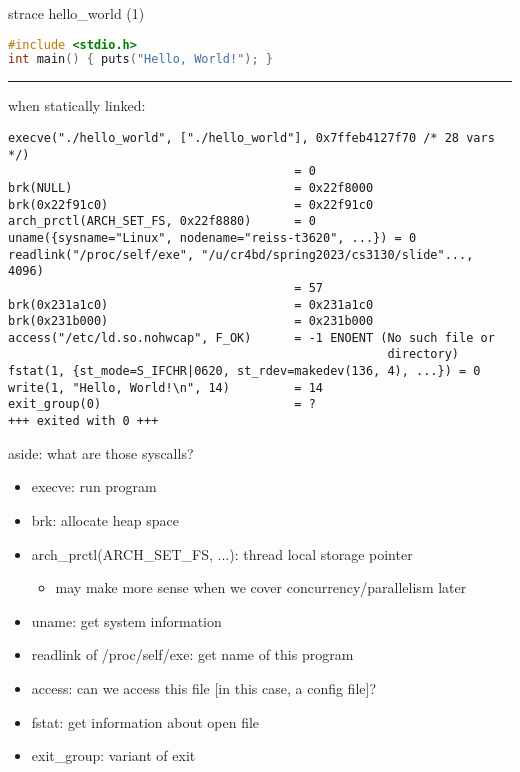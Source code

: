 \begin{frame}[fragile]{strace hello\_world (1)}
\begin{lstlisting}[language=C,style=small]
#include <stdio.h>
int main() { puts("Hello, World!"); }
\end{lstlisting}
\hrule
when statically linked:
\begin{Verbatim}[fontsize=\fontsize{10}{11}\selectfont]
execve("./hello_world", ["./hello_world"], 0x7ffeb4127f70 /* 28 vars */)
                                        = 0
brk(NULL)                               = 0x22f8000
brk(0x22f91c0)                          = 0x22f91c0
arch_prctl(ARCH_SET_FS, 0x22f8880)      = 0
uname({sysname="Linux", nodename="reiss-t3620", ...}) = 0
readlink("/proc/self/exe", "/u/cr4bd/spring2023/cs3130/slide"..., 4096)
                                        = 57
brk(0x231a1c0)                          = 0x231a1c0
brk(0x231b000)                          = 0x231b000
access("/etc/ld.so.nohwcap", F_OK)      = -1 ENOENT (No such file or
                                                     directory)
fstat(1, {st_mode=S_IFCHR|0620, st_rdev=makedev(136, 4), ...}) = 0
write(1, "Hello, World!\n", 14)         = 14
exit_group(0)                           = ?
+++ exited with 0 +++
\end{Verbatim}
\end{frame}

\begin{frame}{aside: what are those syscalls?}
\begin{itemize}
\item execve: run program
\item brk: allocate heap space
\item arch\_prctl(ARCH\_SET\_FS, ...): thread local storage pointer
    \begin{itemize}
    \item may make more sense when we cover concurrency/parallelism later
    \end{itemize}
\item uname: get system information
\item readlink of /proc/self/exe: get name of this program
\item access: can we access this file [in this case, a config file]?
\item fstat: get information about open file
\item exit\_group: variant of exit
\end{itemize}
\end{frame}

